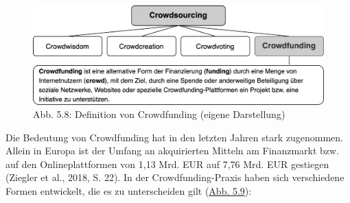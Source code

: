 \documentclass[
  letterpaper,
]{book}
\begin{document}
\begin{figure}

\includegraphics[width=0.9\linewidth,height=\textheight,keepaspectratio]{images/figure58.png} \hfill{}

\caption{Abb. 5.8: Definition von Crowdfunding (eigene Darstellung)}

\end{figure}%

Die Bedeutung von Crowdfunding hat in den letzten Jahren stark
zugenommen. Allein in Europa ist der Umfang an akquirierten Mitteln am
Finanzmarkt bzw. auf den Onlineplattformen von 1,13 Mrd. EUR auf 7,76
Mrd. EUR gestiegen (Ziegler et al., 2018, S. 22). In der
Crowdfunding-Praxis haben sich verschiedene Formen entwickelt, die es zu
unterscheiden gilt (\hyperref[figure59]{Abb. 5.9}):
\end{document}

